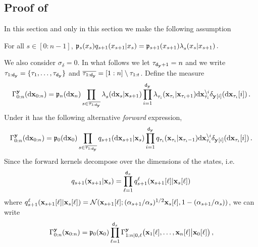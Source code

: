\subsection{Proof of }
\label{proof:noisytonoiseless}
In this section and only in this section we make the following assumption
\begin{hypA}
\label{assp:bweqfwd} For all $s \in [0:n-1]$, 
    $
    \bwmargV{s}{\lstate_s} \fwtrans{s+1}{\lstate_s}{\lstate_{s+1}} = \bwmargV{s+1}{\lstate_{s+1}} \bwtransV{}{s}{\lstate_{s+1}}{\lstate_s} \eqsp. 
    $
\end{hypA}
We also consider $\sigma_{\delta} = 0$. In what follows we let $\tau_{{\mathsf{d}_{\mathbf{y}}}+1} = n$ and we write $\tau_{1:{\mathsf{d}_{\mathbf{y}}}} = \{ \tau_1, \dotsc, \tau_{\mathsf{d}_{\mathbf{y}}} \}$ and $\overline{\tau_{1:{\mathsf{d}_{\mathbf{y}}}}} = [1:n] \setminus \tau_{1:t}$. Define the measure
\begin{equation} 
    \label{eq:joint_noiseless}
    \Gamma^{\diffltrmeas} _{0:n}(\rmd \ltrstate_{0:n}) = \bwmargV{n}{\rmd \ltrstate_n} \prod_{s \in \overline{\tau_{1:\dimtr}}} \bwtransV{}{s}{\ltrstate_{s+1}}{\rmd \ltrstate_{s}}  \prod_{i = 1}^{\dimtr} \bwtransV{}{\tau_i}{\ltrstate_{\tau_i + 1}}{\ltrstate_{\tau_i}} \rmd \projidx{\ltrstate}{\tau_i}{i} \delta_{\vecidx{\diffltrmeas}{}{i}} (\rmd \vecidx{\ltrstate}{\tau_i}{i}) \eqsp.
\end{equation} 
Under \assp{\ref{assp:bweqfwd}} it has the following alternative \emph{forward} expression, 
\begin{equation} 
    \label{eq:joint_noiseless:forward}
    \Gamma^\diffltrmeas _{0:n}(\rmd \chunk{\ltrstate}{0}{n})  = \bwmargV{0}{\rmd \ltrstate_0} \prod_{s \in \overline{\tau_{1:\dimtr}}} \fwtrans{s+1}{\ltrstate_{s}}{\rmd \ltrstate_{s+1}} \prod_{i = 1}^\dimtr \fwtrans{\tau_i}{\ltrstate_{\tau_i - 1}}{\ltrstate_{\tau_i}} \rmd \projidx{\ltrstate}{\tau_i}{i} \delta_{\vecidx{\diffltrmeas}{}{i}} (\rmd \vecidx{\ltrstate}{\tau_i}{i}) \eqsp.
\end{equation}
Since the forward kernels decompose over the dimensions of the states, i.e. $$\fwtrans{s+1}{\ltrstate_s}{\ltrstate_{s+1}} = \prod_{\ell = 1}^{\dimx} \idxfwtrans{s+1}{\vecidx{\ltrstate}{s}{\ell}}{\vecidx{\ltrstate}{s+1}{\ell}}{\ell}$$ where $\idxfwtrans{s+1}{\vecidx{\ltrstate}{s}{\ell}}{\vecidx{\ltrstate}{s+1}{\ell}}{\ell} = \normpdf(\vecidx{\ltrstate}{s+1}{\ell}; (\alpha_{s+1} / \alpha_s)^{1/2} \vecidx{\ltrstate}{s}{\ell}, 1 - (\alpha _{s+1} / \alpha_s) )$, we can write 
\begin{equation}
    \label{eq:joint_noiseless:forward:dim_decomp}
    \Gamma^{\diffltrmeas} _{0:n}(\ltrstate_{0:n}) = \bwmargV{0}{\ltrstate_0} \prod_{\ell = 1}^{\dimx} \Gamma^{\diffltrmeas} _{1:n|0, \ell}\big(\vecidx{\ltrstate}{1}{\ell}, \dotsc, \vecidx{\ltrstate}{n}{\ell} \big| \vecidx{\ltrstate}{0}{\ell} \big) \eqsp, 
\end{equation}
